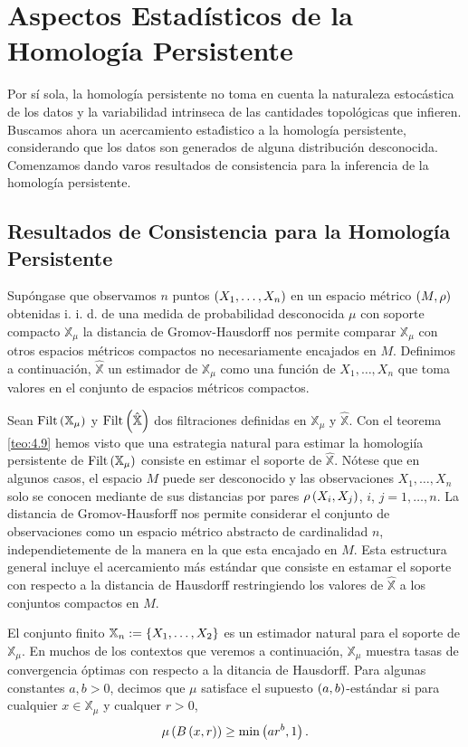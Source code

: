 \chapter{Aspectos Estad\'isticos de la Homolog\'ia Persistente}\label{chap:Cap5}

Por s\'i sola, la homolog\'ia persistente no toma en cuenta la naturaleza estoc\'astica de los datos
y la variabilidad intrinseca de las cantidades topol\'ogicas que infieren.
Buscamos ahora un acercamiento esta\'distico a la homolog\'ia persistente,
considerando que los datos son generados de alguna distribuci\'on desconocida.
Comenzamos dando varos resultados de consistencia para la inferencia de la homolog\'ia persistente.

\section{Resultados de Consistencia para la Homolog\'ia Persistente}

Sup\'ongase que observamos $n$ puntos $\left(X_{1},\dots,X_{n}\right)$ en un espacio m\'etrico
$\left(M,\rho\right)$ obtenidas i. i. d. de una medida de probabilidad desconocida $\mu$ con
soporte compacto $\mathbb{X}_{\mu}$ la distancia de Gromov-Hausdorff nos permite comparar
$\mathbb{X}_{\mu}$ con otros espacios m\'etricos compactos no necesariamente encajados en $M$.
Definimos a continuaci\'on, $\hat{\mathbb{X}}$ un estimador de $\mathbb{X}_{\mu}$
como una funci\'on de $X_{1},\dots,X_{n}$ que toma valores en el conjunto de espacios m\'etricos compactos.

Sean $\mathrm{Filt}\left(\mathbb{X}_{\mu}\right)$ y $\mathrm{Filt}\left(\hat{\mathbb{X}}\right)$
dos filtraciones definidas en $\mathbb{X}_{\mu}$ y $\hat{\mathbb{X}}$.
Con el teorema \ref{teo:4.9} hemos visto que una estrategia natural
para estimar la homologi\'ia persistente de $\mathrm{Filt}\left(\mathbb{X}_{\mu}\right)$
consiste en estimar el soporte de $\hat{\mathbb{X}}$.
N\'otese que en algunos casos, el espacio $M$ puede ser desconocido
y las observaciones $X_{1},\dots,X_{n}$ solo se conocen mediante de sus distancias por pares
$\rho\left(X_{i}, X_{j}\right)$, $i$, $j = 1,\dots,n$.
La distancia de Gromov-Hausforff nos permite considerar el conjunto de observaciones
como un espacio m\'etrico abstracto de cardinalidad $n$,
independietemente de la manera en la que esta encajado en $M$.
Esta estructura general incluye el acercamiento m\'as est\'andar
que consiste en estamar el soporte con respecto a la distancia de Hausdorff
restringiendo los valores de $\hat{\mathbb{X}}$ a los conjuntos compactos en $M$.

El conjunto finito $\mathbb{X}_{n}:=\left\{X_{1},\dots,X_{2}\right\}$
es un estimador natural para el soporte de $\mathbb{X}_{\mu}$.
En muchos de los contextos que veremos a continuaci\'on,
$\mathbb{X}_{\mu}$ muestra tasas de convergencia \'optimas
con respecto a la ditancia de Hausdorff.
Para algunas constantes $a,b>0$, decimos que $\mu$ satisface el supuesto
$\left(a,b\right)$-est\'andar si para cualquier $x\in\mathbb{X}_{\mu}$ y cualquer $r>0$,
\begin{equation}
    \mu\left(B\left(x,r\right)\right)\geq\min\left(ar^{b},1\right).
\end{equation}